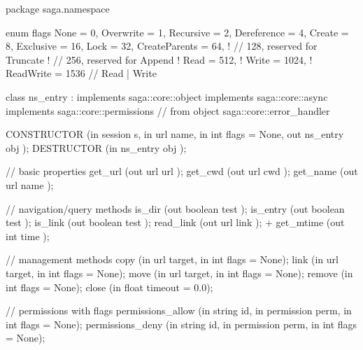  \begin{myspec}
  package saga.namespace
  {
    enum flags
    {
      None            =    0,
      Overwrite       =    1,
      Recursive       =    2,
      Dereference     =    4,
      Create          =    8,
      Exclusive       =   16,
      Lock            =   32,
      CreateParents   =   64,
!     //                 128,    reserved for Truncate
!     //                 256,    reserved for Append
!     Read            =  512,
!     Write           = 1024,
!     ReadWrite       = 1536  // Read | Write
    }
 
 
    class ns_entry : implements   saga::core::object
                     implements   saga::core::async
                     implements   saga::core::permissions
                  // from object  saga::core::error_handler
    {
      CONSTRUCTOR        (in  session        s,
                          in  url            name,
                          in  int            flags   = None,
                          out ns_entry       obj     );
      DESTRUCTOR         (in  ns_entry       obj     );
 
      // basic properties
      get_url            (out url            url     );
      get_cwd            (out url            cwd     );
      get_name           (out url            name    );
 
      // navigation/query methods
      is_dir             (out boolean        test    );
      is_entry           (out boolean        test    );
      is_link            (out boolean        test    );
      read_link          (out url            link    );
+     get_mtime          (out int            time    );
 
      // management methods
      copy               (in  url            target,
                          in  int            flags = None);
      link               (in  url            target,
                          in  int            flags = None);
      move               (in  url            target,
                          in  int            flags = None);
      remove             (in  int            flags = None);
      close              (in  float          timeout = 0.0);
 
 
      // permissions with flags
      permissions_allow  (in  string         id,
                          in  permission     perm, 
                          in  int            flags = None);
      permissions_deny   (in  string         id,
                          in  permission     perm, 
                          in  int            flags = None);
    }
 
}
\end{myspec}
